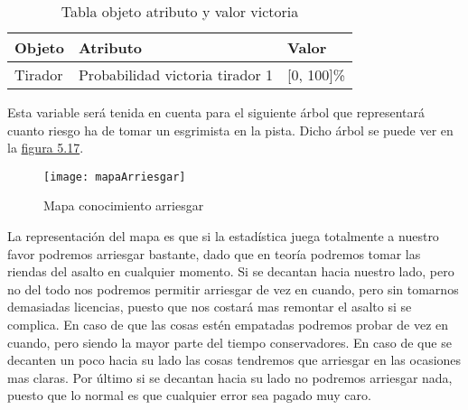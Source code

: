 \begin{longtable}{lll}
  \caption{Tabla objeto atributo y valor victoria}
  \label{tab:Tabla objeto atributo y valor victoria}

  \endfirsthead
  \endhead

  Objeto & Atributo & Valor \\ \hline
  \multicolumn{1}{l|}{Tirador} & Probabilidad victoria tirador 1 & [0, 100]\%
\end{longtable}

Esta variable será tenida en cuenta para el siguiente árbol que representará
cuanto riesgo ha de tomar un esgrimista en la pista. Dicho árbol se puede
ver en la \hyperref[fig:Mapa conocimiento arriesgar]{figura 5.17}.

\begin{figure}[htb]
  \centering
    \texttt{[image: mapaArriesgar]}
  \caption[Mapa conocimiento arriesgar]{Mapa conocimiento arriesgar}
  \label{fig:Mapa conocimiento arriesgar}
\end{figure}

La representación del mapa es que si la estadística juega totalmente a nuestro favor
podremos arriesgar bastante, dado que en teoría podremos tomar las riendas del asalto
en cualquier momento. Si se decantan hacia nuestro lado, pero no del todo nos podremos
permitir arriesgar de vez en cuando, pero sin tomarnos demasiadas licencias, puesto que
nos costará mas remontar el asalto si se complica. En caso de que las cosas estén empatadas
podremos probar de vez en cuando, pero siendo la mayor parte del tiempo conservadores. En
caso de que se decanten un poco hacia su lado las cosas tendremos que arriesgar en las ocasiones
mas claras. Por último si se decantan hacia su lado no podremos arriesgar nada, puesto que lo normal
es que cualquier error sea pagado muy caro.
